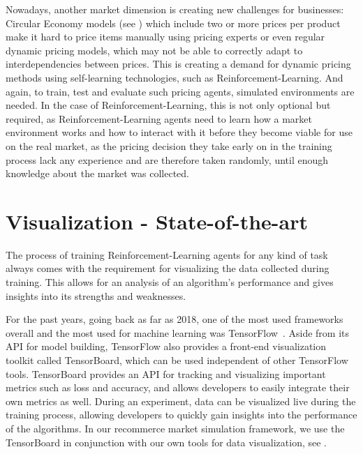 Nowadays, another market dimension is creating new challenges for businesses: Circular Economy models (see ) which include two or more prices per product make it hard to price items manually using pricing experts or even regular dynamic pricing models, which may not be able to correctly adapt to interdependencies between prices. This is creating a demand for dynamic pricing methods using self-learning technologies, such as Reinforcement-Learning. And again, to train, test and evaluate such pricing agents, simulated environments are needed. In the case of Reinforcement-Learning, this is not only optional but required, as Reinforcement-Learning agents need to learn how a market environment works and how to interact with it before they become viable for use on the real market, as the pricing decision they take early on in the training process lack any experience and are therefore taken randomly, until enough knowledge about the market was collected.

\section*{Visualization - State-of-the-art}

The process of training Reinforcement-Learning agents for any kind of task always comes with the requirement for visualizing the data collected during training. This allows for an analysis of an algorithm's performance and gives insights into its strengths and weaknesses.

For the past years, going back as far as 2018, one of the most used frameworks overall and the most used for machine learning was TensorFlow~\cite{StackOverflowSurvey}. Aside from its API for model building, TensorFlow also provides a front-end visualization toolkit called TensorBoard, which can be used independent of other TensorFlow tools. TensorBoard provides an API for tracking and visualizing important metrics such as loss and accuracy, and allows developers to easily integrate their own metrics as well. During an experiment, data can be visualized live during the training process, allowing developers to quickly gain insights into the performance of the algorithms. In our recommerce market simulation framework, we use the TensorBoard in conjunction with our own tools for data visualization, see .

